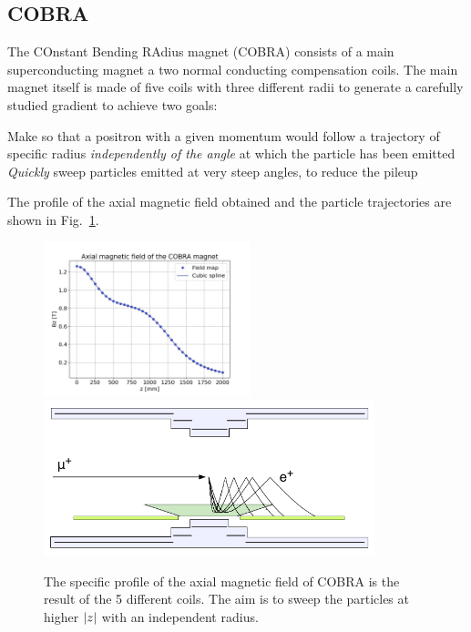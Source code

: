 \begin{refsection}
    \subsection{COBRA}
    \label{MEG:COBRA}
        The COnstant Bending RAdius magnet (COBRA) consists of a main superconducting magnet a two normal conducting compensation coils.
        The main magnet itself is made of five coils with three different radii to generate a carefully studied gradient to achieve two goals:
        \begin{outline}
            \1 Make so that a positron with a given momentum would follow a trajectory of specific radius \textit{independently of the angle} at which the particle has been emitted
            \1 \textit{Quickly} sweep particles emitted at very steep angles, to reduce the pileup
        \end{outline}
        The profile of the axial magnetic field obtained and the particle trajectories are shown in Fig.~\ref{fig:MEGII:COBRA:B}.
        
        \begin{figure}
            \centering
            \includegraphics[height = 4.5cm]{Figures/MEG/COBRA_B.jpeg}
            \includegraphics[height = 4.5cm]{Figures/MEG/cobra_effect_meg1.png}
            \caption[COBRA]{The specific profile of the axial magnetic field of COBRA is the result of the 5 different coils. The aim is to sweep the particles at higher $\abs{z}$ with an independent radius.}
            \label{fig:MEGII:COBRA:B}
        \end{figure}
        

\end{refsection}
